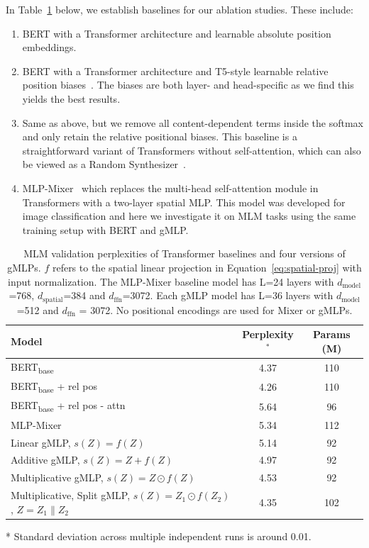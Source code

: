 \documentclass{article}
\newcommand{\gffn}{gMLP\xspace}
\begin{document}
In Table~\ref{tab:baselines} below, we establish baselines for our ablation studies.
These include:
\begin{enumerate}
\item BERT with a Transformer architecture and learnable absolute position embeddings.
\item BERT with a Transformer architecture and T5-style learnable relative position biases~\cite{raffel2019exploring}.
The biases are both layer- and head-specific as we find this yields the best results.
\item Same as above, but we remove all content-dependent terms inside the softmax and only retain the relative positional biases. This baseline is a straightforward variant of Transformers without self-attention,
which can also be viewed as a Random Synthesizer~\cite{tay2020synthesizer}.
\item MLP-Mixer~\cite{tolstikhin2021mlpmixer} which replaces the multi-head self-attention module in Transformers with a two-layer spatial MLP.
This model was developed for image classification and here we investigate it on MLM tasks using the same training setup with BERT and gMLP.
\end{enumerate}

\begin{table}[h]
\centering\small
\caption{MLM validation perplexities of Transformer baselines and four versions of \gffn{s}. $f$ refers to the spatial linear projection in Equation~\eqref{eq:spatial-proj} with input normalization.
The MLP-Mixer baseline model has L=24 layers with $d_\mathrm{model}$=768, $d_\mathrm{spatial}$=384 and $d_\mathrm{ffn}$=3072.
Each \gffn model has L=36 layers with $d_\mathrm{model}$=512 and $d_\mathrm{ffn}$ = 3072. No positional encodings are used for Mixer or \gffn{s}.}
\begin{threeparttable}
\begin{tabular}{@{}l|c|c@{}}
\toprule
Model & Perplexity$^*$ & Params (M) \\ \midrule
BERT\textsubscript{base} &  4.37 &  110 \\
BERT\textsubscript{base} + rel pos & 4.26 & 110 \\ 
BERT\textsubscript{base} + rel pos - attn & 5.64 & 96 \\ \midrule
MLP-Mixer & 5.34 & 112 \\
\midrule
Linear \gffn, $s(Z) = f(Z)$ & 5.14 & 92 \\
Additive \gffn, $s(Z) = Z + f(Z)$ & 4.97 & 92 \\
Multiplicative \gffn, $s(Z) = Z \odot f(Z)$  & 4.53 & 92 \\ 
Multiplicative, Split \gffn, $s(Z) = Z_1 \odot f(Z_2)$, $Z=Z_1\|Z_2$  & 4.35 & 102 \\

\bottomrule
\end{tabular}
\begin{tablenotes}
  \small
  \item[*] Standard deviation across multiple independent runs is around 0.01.
\end{tablenotes}
\end{threeparttable}
\vspace{-0.525cm}
\label{tab:baselines}
\end{table}
\end{document}
